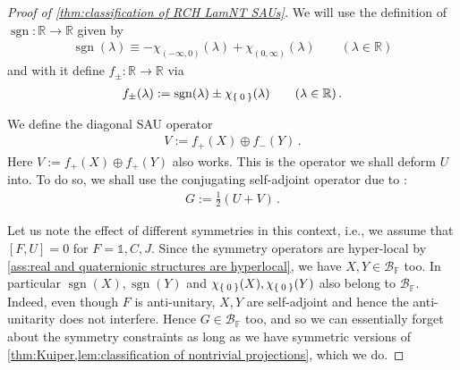 \documentclass[a4paper,10pt]{article}
\numberwithin{equation}{section}
\theoremstyle{plain}
\theoremstyle{plain}
\theoremstyle{plain}
\theoremstyle{plain}
\theoremstyle{plain}
\theoremstyle{remark}
\theoremstyle{definition}
\theoremstyle{plain}
\newcommand{\RR}{\mathbb{R}}
\newcommand{\FF}{\mathbb{F}}
\newcommand{\calB}{\mathcal{B}}
\newcommand{\Id}{\mathds{1}}
\newcommand{\sgn}{\operatorname{sgn}}
\newcommand{\eql}[1]{\begin{align}#1\end{align}}
\begin{document}
\begin{proof}[Proof of \cref{thm:classification of RCH LamNT SAUs}]
		We will use the definition of $\sgn:\RR\to\RR$ given by \eql{\label{eq:sgn function}\sgn(\lambda) \equiv -\chi_{(-\infty,0)}(\lambda) +\chi_{(0,\infty)}(\lambda)\qquad(\lambda\in\RR)} and with it define $f_\pm:\RR\to\RR$ via \eql{\label{eq:fpm function}f_\pm(\lambda) := \sgn(\lambda) \pm \chi_{\Set{0}}(\lambda)\qquad(\lambda\in\RR)\,.}
		
		We define the diagonal SAU operator 
		\eql{\label{eq:V diagonal from SAU U}V:=f_+(X)\oplus f_-(Y)\,.}
		Here $V:=f_+(X)\oplus f_+(Y)$ also works.
		This is the operator we shall deform $U$ into. To do so, we shall use the conjugating self-adjoint operator due to \cite{AndruchowChiumientoLucero2015}: \eql{\label{eq:G invertible from U and V}G := \frac{1}{2}\left(U + V\right)\,.}
		
		Let us note the effect of different symmetries in this context, i.e., we assume that $[F,U]=0$ for $F=\Id,C,J$. Since the symmetry operators are hyper-local by \cref{ass:real and quaternionic structures are hyperlocal}, we have $X,Y\in\calB_\FF$ too. In particular $\sgn(X),\sgn(Y)$ and $\chi_{\Set{0}}(X),\chi_{\Set{0}}(Y)$ also belong to $\calB_\FF.$ Indeed, even though $F$ is anti-unitary, $X,Y$ are self-adjoint and hence the anti-unitarity does not interfere. Hence $G\in\calB_\FF$ too, and so we can essentially forget about the symmetry constraints as long as we have symmetric versions of \cref{thm:Kuiper,lem:classification of nontrivial projections}, which we do.
		

\end{proof}
\end{document}
